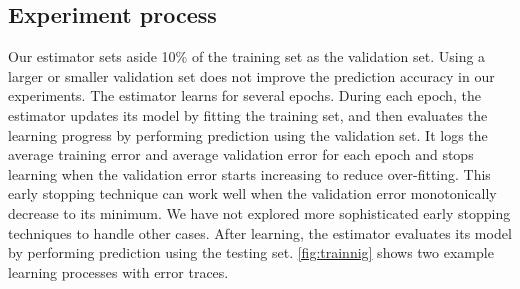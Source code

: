 \documentclass[twocolumn]{article}
\begin{document}
\subsection{Experiment process}
Our estimator sets aside 10\% of the training set as the validation set.
Using a larger or smaller validation set does not improve the prediction 
accuracy 
in our experiments.
The estimator learns for several epochs.
During each epoch, the estimator updates its model by fitting the training set, 
and then evaluates the learning progress by performing prediction using the 
validation set.
It logs the average training error and average validation error for each epoch 
and stops learning when the validation error starts increasing to reduce 
over-fitting.
This early stopping technique can work well when the validation error 
monotonically decrease to its minimum.
We have not explored more sophisticated early stopping techniques to handle 
other cases.
After learning, the estimator evaluates its model by performing prediction 
using the testing set.
\autoref{fig:trainnig} shows two example learning processes with error traces.
\end{document}
